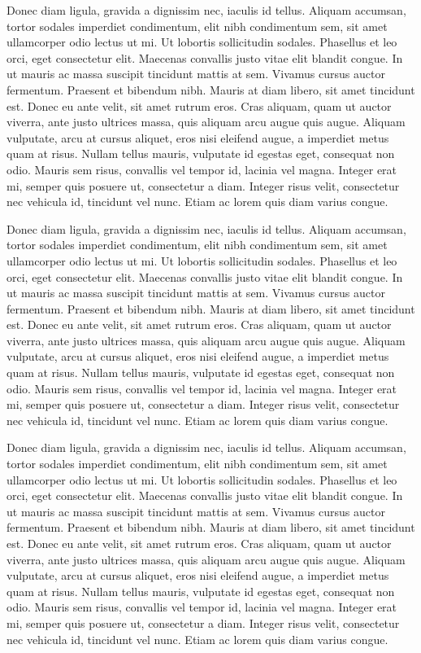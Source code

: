 Donec diam ligula, gravida a dignissim nec, iaculis id tellus. Aliquam accumsan, tortor sodales imperdiet condimentum, elit nibh condimentum sem, sit amet ullamcorper odio lectus ut mi. Ut lobortis sollicitudin sodales. Phasellus et leo orci, eget consectetur elit. Maecenas convallis justo vitae elit blandit congue. In ut mauris ac massa suscipit tincidunt mattis at sem. Vivamus cursus auctor fermentum. Praesent et bibendum nibh. Mauris at diam libero, sit amet tincidunt est. Donec eu ante velit, sit amet rutrum eros. Cras aliquam, quam ut auctor viverra, ante justo ultrices massa, quis aliquam arcu augue quis augue. Aliquam vulputate, arcu at cursus aliquet, eros nisi eleifend augue, a imperdiet metus quam at risus. Nullam tellus mauris, vulputate id egestas eget, consequat non odio. Mauris sem risus, convallis vel tempor id, lacinia vel magna. Integer erat mi, semper quis posuere ut, consectetur a diam. Integer risus velit, consectetur nec vehicula id, tincidunt vel nunc. Etiam ac lorem quis diam varius congue.

Donec diam ligula, gravida a dignissim nec, iaculis id tellus. Aliquam accumsan, tortor sodales imperdiet condimentum, elit nibh condimentum sem, sit amet ullamcorper odio lectus ut mi. Ut lobortis sollicitudin sodales. Phasellus et leo orci, eget consectetur elit. Maecenas convallis justo vitae elit blandit congue. In ut mauris ac massa suscipit tincidunt mattis at sem. Vivamus cursus auctor fermentum. Praesent et bibendum nibh. Mauris at diam libero, sit amet tincidunt est. Donec eu ante velit, sit amet rutrum eros. Cras aliquam, quam ut auctor viverra, ante justo ultrices massa, quis aliquam arcu augue quis augue. Aliquam vulputate, arcu at cursus aliquet, eros nisi eleifend augue, a imperdiet metus quam at risus. Nullam tellus mauris, vulputate id egestas eget, consequat non odio. Mauris sem risus, convallis vel tempor id, lacinia vel magna. Integer erat mi, semper quis posuere ut, consectetur a diam. Integer risus velit, consectetur nec vehicula id, tincidunt vel nunc. Etiam ac lorem quis diam varius congue.

Donec diam ligula, gravida a dignissim nec, iaculis id tellus. Aliquam accumsan, tortor sodales imperdiet condimentum, elit nibh condimentum sem, sit amet ullamcorper odio lectus ut mi. Ut lobortis sollicitudin sodales. Phasellus et leo orci, eget consectetur elit. Maecenas convallis justo vitae elit blandit congue. In ut mauris ac massa suscipit tincidunt mattis at sem. Vivamus cursus auctor fermentum. Praesent et bibendum nibh. Mauris at diam libero, sit amet tincidunt est. Donec eu ante velit, sit amet rutrum eros. Cras aliquam, quam ut auctor viverra, ante justo ultrices massa, quis aliquam arcu augue quis augue. Aliquam vulputate, arcu at cursus aliquet, eros nisi eleifend augue, a imperdiet metus quam at risus. Nullam tellus mauris, vulputate id egestas eget, consequat non odio. Mauris sem risus, convallis vel tempor id, lacinia vel magna. Integer erat mi, semper quis posuere ut, consectetur a diam. Integer risus velit, consectetur nec vehicula id, tincidunt vel nunc. Etiam ac lorem quis diam varius congue.

